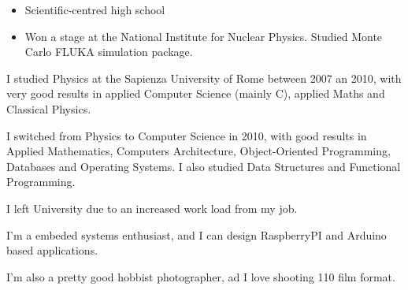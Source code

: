 \documentclass[10pt,a4paper]{altacv}
\begin{document}

\begin{itemize}
\item Scientific-centred high school
\item Won a stage at the National Institute for Nuclear Physics. Studied Monte Carlo FLUKA simulation package.
\end{itemize}

I studied Physics at the Sapienza University of Rome between 2007 an 2010, with very good results in applied Computer Science (mainly C), applied Maths and Classical Physics.

\smallskip

I switched from Physics to Computer Science in 2010, with good results in Applied Mathematics, Computers Architecture, Object-Oriented Programming, Databases and Operating Systems. I also studied Data Structures and Functional Programming.

\smallskip

I left University due to an increased work load from my job.

I'm a embeded systems enthusiast, and I can design RaspberryPI and Arduino based applications.

\smallskip

I'm also a pretty good hobbist photographer, ad I love shooting 110 film format.
\end{document}
